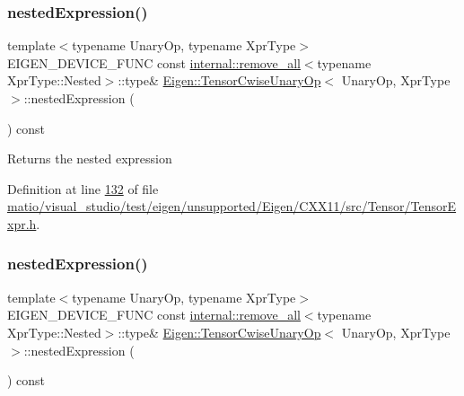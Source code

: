 \subsubsection{\texorpdfstring{nested\+Expression()}{nestedExpression()}\hspace{0.1cm}{\footnotesize\ttfamily [1/2]}}
{\footnotesize\ttfamily template$<$typename Unary\+Op, typename Xpr\+Type$>$ \\
E\+I\+G\+E\+N\+\_\+\+D\+E\+V\+I\+C\+E\+\_\+\+F\+U\+NC const \hyperlink{struct_eigen_1_1internal_1_1remove__all}{internal\+::remove\+\_\+all}$<$typename Xpr\+Type\+::\+Nested$>$\+::type\& \hyperlink{class_eigen_1_1_tensor_cwise_unary_op}{Eigen\+::\+Tensor\+Cwise\+Unary\+Op}$<$ Unary\+Op, Xpr\+Type $>$\+::nested\+Expression (\begin{DoxyParamCaption}{ }\end{DoxyParamCaption}) const\hspace{0.3cm}{\ttfamily [inline]}}

\begin{DoxyReturn}{Returns}
the nested expression 
\end{DoxyReturn}


Definition at line \hyperlink{matio_2visual__studio_2test_2eigen_2unsupported_2_eigen_2_c_x_x11_2src_2_tensor_2_tensor_expr_8h_source_l00132}{132} of file \hyperlink{matio_2visual__studio_2test_2eigen_2unsupported_2_eigen_2_c_x_x11_2src_2_tensor_2_tensor_expr_8h_source}{matio/visual\+\_\+studio/test/eigen/unsupported/\+Eigen/\+C\+X\+X11/src/\+Tensor/\+Tensor\+Expr.\+h}.

\mbox{\label{class_eigen_1_1_tensor_cwise_unary_op_af3a260b2117072817e641d72038cce51}} 
\subsubsection{\texorpdfstring{nested\+Expression()}{nestedExpression()}\hspace{0.1cm}{\footnotesize\ttfamily [2/2]}}
{\footnotesize\ttfamily template$<$typename Unary\+Op, typename Xpr\+Type$>$ \\
E\+I\+G\+E\+N\+\_\+\+D\+E\+V\+I\+C\+E\+\_\+\+F\+U\+NC const \hyperlink{struct_eigen_1_1internal_1_1remove__all}{internal\+::remove\+\_\+all}$<$typename Xpr\+Type\+::\+Nested$>$\+::type\& \hyperlink{class_eigen_1_1_tensor_cwise_unary_op}{Eigen\+::\+Tensor\+Cwise\+Unary\+Op}$<$ Unary\+Op, Xpr\+Type $>$\+::nested\+Expression (\begin{DoxyParamCaption}{ }\end{DoxyParamCaption}) const\hspace{0.3cm}{\ttfamily [inline]}}

